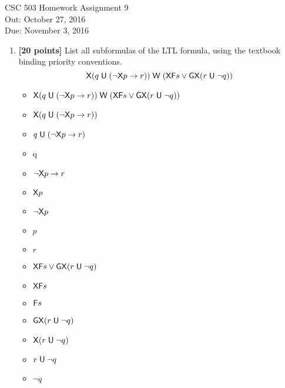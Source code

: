 \documentclass{article}
\begin{document}
\begin{center}
  {\LARGE CSC 503 Homework Assignment 9}\\[1pc]
  Out: October 27, 2016 \\
  Due: November 3, 2016 \\
\end{center}

\begin{enumerate}
\item \textbf{[20 points]} List all subformulas of the LTL
  formula, using the textbook binding priority conventions.
  \begin{displaymath}
    \mathord{\mathsf{X}} (q \mathrel{\mathsf{U}} (\neg \mathord{\mathsf{X}} p \rightarrow r)) \mathrel{\mathsf{W}} 
    (\mathord{\mathsf{X}} \mathord{\mathsf{F}} s \lor \mathord{\mathsf{G}} \mathord{\mathsf{X}} (r \mathrel{\mathsf{U}} \neg q))
  \end{displaymath}
  \begin{answer}
  \begin{itemize}
    \item $\mathord{\mathsf{X}} (q \mathrel{\mathsf{U}} (\neg \mathord{\mathsf{X}} p \rightarrow r)) \mathrel{\mathsf{W}} 
    (\mathord{\mathsf{X}} \mathord{\mathsf{F}} s \lor \mathord{\mathsf{G}} \mathord{\mathsf{X}} (r \mathrel{\mathsf{U}} \neg q))$
    \item $\mathord{\mathsf{X}} (q \mathrel{\mathsf{U}} (\neg \mathord{\mathsf{X}} p \rightarrow r))$
    \item $q \mathrel{\mathsf{U}} (\neg \mathord{\mathsf{X}} p \rightarrow r)$
    \item q
    \item $\neg \mathord{\mathsf{X}} p \rightarrow r$
    \item $\mathord{\mathsf{X}} p$
    \item $\neg \mathord{\mathsf{X}} p$
    \item $p$
    \item $r$
    \item $\mathord{\mathsf{X}} \mathord{\mathsf{F}} s \lor \mathord{\mathsf{G}} \mathord{\mathsf{X}} (r \mathrel{\mathsf{U}} \neg q)$
    \item $\mathord{\mathsf{X}} \mathord{\mathsf{F}} s$
    \item $\mathord{\mathsf{F}} s$
    \item $\mathord{\mathsf{G}} \mathord{\mathsf{X}} (r \mathrel{\mathsf{U}} \neg q)$
    \item $\mathord{\mathsf{X}} (r \mathrel{\mathsf{U}} \neg q)$
    \item $r \mathrel{\mathsf{U}} \neg q$ 
    \item $\neg q$


    \end{itemize}
  \end{answer}
  


\end{enumerate}
\end{document}
